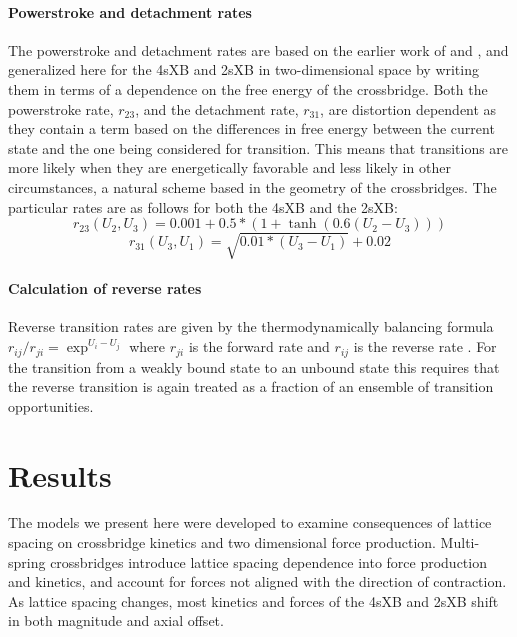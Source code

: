 \documentclass[]{article}
\begin{document}
\paragraph{Powerstroke and detachment rates} %
The powerstroke and detachment rates are based on the earlier work of \citet{Pate1989} and \citet{Tanner2007}, and generalized here for the 4sXB and 2sXB in two-dimensional space by writing them in terms of a dependence on the free energy of the crossbridge. 
Both the powerstroke rate, $r_{23}$, and the detachment rate, $r_{31}$, are distortion dependent as they contain a term based on the differences in free energy between the current state and the one being considered for transition. 
This means that transitions are more likely when they are energetically favorable and less likely in other circumstances, a natural scheme based in the geometry of the crossbridges.
The particular rates are as follows for both the 4sXB and the 2sXB:
$$r_{23}(U_2, U_3) = 0.001 + 0.5 * (1 + \tanh(0.6 (U_2 - U_3))) $$
$$r_{31}(U_3, U_1) = \sqrt{0.01 *  (U_3 - U_1)} + 0.02$$

\paragraph{Calculation of reverse rates} %
Reverse transition rates are given by the thermodynamically balancing formula $r_{ij}/r_{ji}=\exp^{U_i-U_j}$ where $r_{ji}$ is the forward rate and $r_{ij}$ is the reverse rate \citep{Pate1989, Daniel1998, Tanner2007}.
For the transition from a weakly bound state to an unbound state this requires that the reverse transition is again treated as a fraction of an ensemble of transition opportunities.



\section{Results} %

The models we present here were developed to examine consequences of lattice spacing on crossbridge kinetics and two dimensional force production.
Multi-spring crossbridges introduce lattice spacing dependence into force production and kinetics, and account for forces not aligned with the direction of contraction.
As lattice spacing changes, most kinetics and forces of the 4sXB and 2sXB shift in both magnitude and axial offset.
\end{document}
